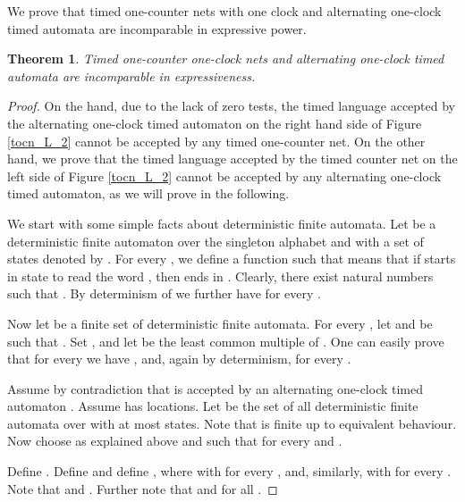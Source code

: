 \documentclass{CSML}
\theoremstyle{plain}\newtheorem{theorem}[thm]{Theorem}
\theoremstyle{plain}\newtheorem{corollary}[thm]{Corollary}
\theoremstyle{plain}\newtheorem{example}[thm]{Example}
\theoremstyle{plain}\newtheorem{lemma}[thm]{Lemma}
\theoremstyle{plain}\newtheorem{remark}[thm]{Remark}
\begin{document}
We prove that timed one-counter nets with one clock and alternating one-clock timed automata are incomparable in expressive power. 
\begin{theorem}
	Timed one-counter one-clock nets and alternating one-clock timed automata are incomparable in expressiveness.
\end{theorem}
\begin{proof}
	On the hand, due to the lack of zero tests, 
	the timed language accepted by the alternating one-clock timed automaton on the right hand side of Figure \ref{tocn_L_2} cannot be accepted by any timed one-counter net. 
	On the other hand, 
	we prove that the timed language  accepted by the timed counter net on the left side of Figure \ref{tocn_L_2} cannot be accepted by any alternating one-clock timed automaton, as we will prove in the following. 
	
	
	We start with some simple facts about deterministic finite automata. 	
	Let  be a deterministic finite automaton over the singleton alphabet  and with a set of states denoted by . 
	For every , 
	we define a function  such that  means that if  starts in state  to read the word , then  ends in . 
	Clearly, there exist natural numbers  such that . 
	By determinism of  we further have  for every . 
	
	Now let  be a finite set of deterministic finite automata. 
	For every , let  and  be such that . 
	Set , and let  be the least common multiple of . 
	One can easily prove that for every  we have , and, again by determinism, 
	 for every . 
	
	
	
	
	
	
	
	
	
	
	Assume by contradiction that  is accepted by an alternating  one-clock timed automaton .
	Assume  has  locations.
	Let  be the set of all deterministic finite automata over  with at most  states. Note that  is finite up to equivalent behaviour. 
	Now choose  as explained above and such that 
	 for every  and . 
	
	
	
	
	
	
	



	
	Define . 
	Define 
	and define , 	
	where  with  for every , 
	and, similarly,  with  for every .
	Note that  and .
	Further note that  and  for all . 
	
	
	

\end{proof}
\end{document}
